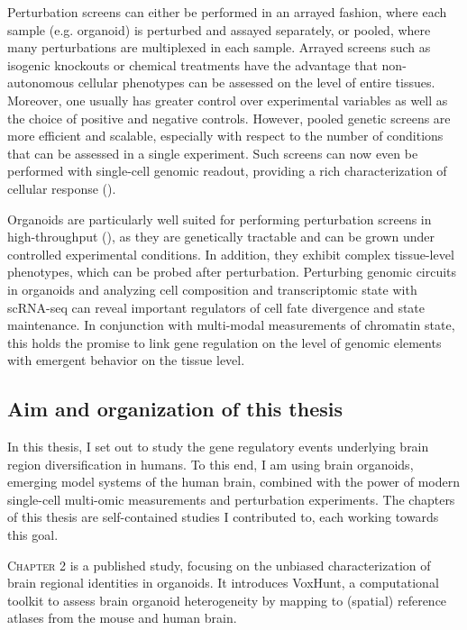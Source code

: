 Perturbation screens can either be performed in an arrayed fashion, where each sample (e.g. organoid) is perturbed and assayed separately, or pooled, where many perturbations are multiplexed in each sample. Arrayed screens such as isogenic knockouts or chemical treatments have the advantage that non-autonomous cellular phenotypes can be assessed on the level of entire tissues. Moreover, one usually has greater control over experimental variables as well as the choice of positive and negative controls. However, pooled genetic screens are more efficient and scalable, especially with respect to the number of conditions that can be assessed in a single experiment. Such screens can now even be performed with single-cell genomic readout, providing a rich characterization of cellular response (\cite{dixit_perturb-seq_2016,datlinger_pooled_2017}). 

Organoids are particularly well suited for performing perturbation screens in high-throughput (\cite{camp_mapping_2019}), as they are genetically tractable and can be grown under controlled experimental conditions. In addition, they exhibit complex tissue-level phenotypes, which can be probed after perturbation. Perturbing genomic circuits in organoids and analyzing cell composition and transcriptomic state with scRNA-seq can reveal important regulators of cell fate divergence and state maintenance. In conjunction with multi-modal measurements of chromatin state, this holds the promise to link gene regulation on the level of genomic elements with emergent behavior on the tissue level.



\subsection{Aim and organization of this thesis}

In this thesis, I set out to study the gene regulatory events underlying brain region diversification in humans. To this end, I am using brain organoids, emerging model systems of the human brain, combined with the power of modern single-cell multi-omic measurements and perturbation experiments. The chapters of this thesis are self-contained studies I contributed to, each working towards this goal.

{\scshape Chapter 2} is a published study, focusing on the unbiased characterization of brain regional identities in organoids. It introduces VoxHunt, a computational toolkit to assess brain organoid heterogeneity by mapping to (spatial) reference atlases from the mouse and human brain.

